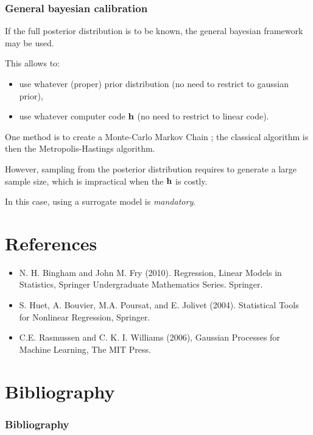 \documentclass{beamer}
\begin{document}
\begin{frame}
\frametitle{General bayesian calibration}

If the full posterior distribution is to be known, the 
general bayesian framework may be used. 

This allows to:
\begin{itemize}
\item use whatever (proper) prior distribution (no need to restrict to gaussian 
prior),
\item use whatever computer code ${\bf h}$ (no need to restrict to linear 
code).
\end{itemize}

One method is to create a Monte-Carlo Markov Chain ; the classical algorithm is then the 
Metropolis-Hastings algorithm. 

However, sampling from the posterior distribution 
requires to generate a large sample size, which is impractical 
when the ${\bf h}$ is costly. 

In this case, using a surrogate model is \emph{mandatory}. 

\end{frame}

\section{References}

\begin{itemize}
\item  N. H. Bingham and John M. Fry (2010). Regression, Linear Models in Statistics, Springer Undergraduate Mathematics Series. Springer.
\item S. Huet, A. Bouvier, M.A. Poursat, and E. Jolivet (2004). Statistical Tools for Nonlinear Regression, Springer.
\item C.E. Rasmussen and C. K. I. Williams (2006), Gaussian Processes for Machine Learning, The MIT Press.
\end{itemize}

\section{Bibliography}
\begin{frame}[allowframebreaks]
\frametitle{Bibliography}
\nocite{*}


\end{frame}
\end{document}
